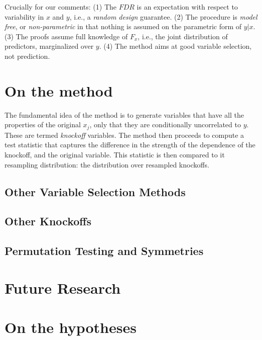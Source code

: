 \documentclass[article,lineno]{biometrika}
\begin{document}
Crucially for our comments:
(1) The $FDR$ is an expectation with respect to variability in $x$ and $y$, i.e., a \emph{random design} guarantee. 
(2) The procedure is \emph{model free}, or \emph{non-parametric} in that nothing is assumed on the parametric form of $y|x$. 
(3) The proofs assume full knowledge of $F_x$, i.e., the joint distribution of predictors, marginalized over $y$.
(4) The method aims at good variable selection, not prediction. 



\section{On the method}
The fundamental idea of the method is to generate variables that have all the properties of the original $x_j$, only that they are conditionally uncorrelated to $y$. 
These are termed \emph{knockoff} variables. 
The method then proceeds to compute a test statistic that captures the difference in the strength of the dependence of the knockoff, and the original variable. 
This statistic is then compared to it resampling distribution: the distribution over resampled knockoffs. 




\subsection{Other Variable Selection Methods}

\subsection{Other Knockoffs}



\subsection{Permutation Testing and Symmetries}



\section{Future Research}


\section{On the hypotheses}
\end{document}
